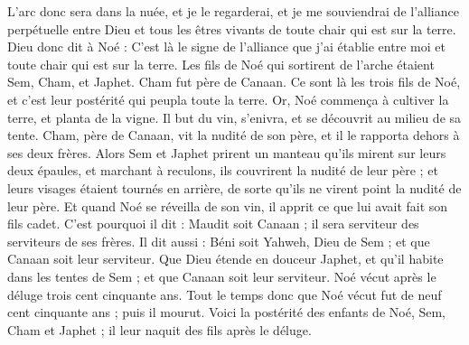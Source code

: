 \begin{multicols}{2}
L'arc donc sera dans la nuée, et je le regarderai, et je me souviendrai de l'alliance perpétuelle entre Dieu et tous les êtres vivants  de toute chair qui est sur la terre.
Dieu donc dit à Noé : C'est là le signe de l'alliance que j'ai établie entre moi et toute chair qui est sur la terre.
Les fils de Noé qui sortirent de l'arche étaient Sem, Cham, et Japhet. Cham fut père de Canaan.
Ce sont là les trois fils de Noé, et c’est leur postérité qui peupla toute la terre.
Or, Noé commença à cultiver la terre, et planta de la vigne.
Il but du vin, s'enivra, et se découvrit au milieu de sa tente.
Cham, père de Canaan, vit la nudité de son père, et il le rapporta dehors à ses deux frères.
Alors Sem et Japhet prirent un manteau qu'ils mirent sur leurs deux épaules, et marchant à reculons, ils couvrirent la nudité de leur père ; et leurs visages étaient tournés en arrière, de sorte qu'ils ne virent point la nudité de leur père.
Et quand Noé se réveilla de son vin, il apprit ce que lui avait fait son fils cadet.
C'est pourquoi il dit : Maudit soit Canaan ; il sera serviteur des serviteurs de ses frères.
Il dit aussi : Béni soit Yahweh, Dieu de Sem ; et que Canaan soit leur serviteur.
Que Dieu étende en douceur Japhet, et qu’il habite dans les tentes de Sem ; et que Canaan soit leur serviteur.
Noé vécut après le déluge trois cent cinquante ans.
Tout le temps donc que Noé vécut fut de neuf cent cinquante ans ; puis il mourut.
\VerseOne{}Voici la postérité des enfants de Noé, Sem, Cham et Japhet ; il leur naquit des fils après le déluge.

\end{multicols}
